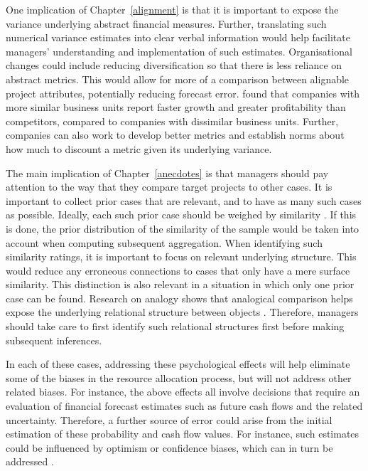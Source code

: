 \documentclass[a4paper, nobind, dvipsnames]{templates/ociamthesis}
\theoremstyle{definition}
\theoremstyle{definition}
\theoremstyle{definition}
\theoremstyle{definition}
\theoremstyle{remark}
\begin{document}
One implication of Chapter~\ref{alignment} is that it is important to expose
the variance underlying abstract financial measures. Further, translating such
numerical variance estimates into clear verbal information would help facilitate
managers' understanding and implementation of such estimates. Organisational
changes could include reducing diversification so that there is less reliance on
abstract metrics. This would allow for more of a comparison between alignable
project attributes, potentially reducing forecast error. \textcite{koller2017} found that
companies with more similar business units report faster growth and greater
profitability than competitors, compared to companies with dissimilar business
units. Further, companies can also work to develop better metrics and establish
norms about how much to discount a metric given its underlying variance.

The main implication of Chapter~\ref{anecdotes} is that managers should pay
attention to the way that they compare target projects to other cases. It is
important to collect prior cases that are relevant, and to have as many such
cases as possible. Ideally, each such prior case should be weighed by similarity
\autocite{lovallo2012}. If this is done, the prior distribution of the similarity of the
sample would be taken into account when computing subsequent aggregation. When
identifying such similarity ratings, it is important to focus on relevant
underlying structure. This would reduce any erroneous connections to cases that
only have a mere surface similarity. This distinction is also relevant in a
situation in which only one prior case can be found. Research on analogy shows
that analogical comparison helps expose the underlying relational structure
between objects \autocites[e.g.,][]{kurtz2013,markman1993}. Therefore, managers should
take care to first identify such relational structures first before making
subsequent inferences.

In each of these cases, addressing these psychological effects will help
eliminate some of the biases in the resource allocation process, but will not
address other related biases. For instance, the above effects all involve
decisions that require an evaluation of financial forecast estimates such as
future cash flows and the related uncertainty. Therefore, a further source of
error could arise from the initial estimation of these probability and cash flow
values. For instance, such estimates could be influenced by optimism or
confidence biases, which can in turn be addressed \autocite{flyvbjerg2018}.
\end{document}
